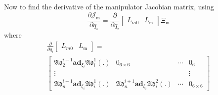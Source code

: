 \documentclass[lettersize,journal]{IEEEtran}
\def \Add {\mathfrak{Ad}}
\begin{document}
Now to find the derivative of the manipulator Jacobian matrix,
using
\begin{equation}\frac{\partial\mathcal{J}_\mathfrak{m}}{\partial q_i}=\frac{\partial}{\partial q_i}\begin{bmatrix}L_{m0}&L_\mathfrak{m}\end{bmatrix}\Xi_\mathfrak{m} \label{Jdot}\end{equation}
where
\begin{multline} \frac{\partial }{\partial q_i}\begin{bmatrix}L_{m0}&L_\mathfrak{m}\end{bmatrix}=\\
\begin{bmatrix}\Add_2^{i+1}\textbf{ad}_{\xi_i}\Add_i^1(.) &0_{6\times6}&\cdots&0_6\\\vdots & & &\vdots\\\Add_n^{i+1}\textbf{ad}_{\xi_i}\Add_i^1(.) &\Add_n^{i+1}\textbf{ad}_{\xi_i}\Add_i^2(.)&\cdots&0_{6\times6} \end{bmatrix}
\end{multline}

\end{document}
